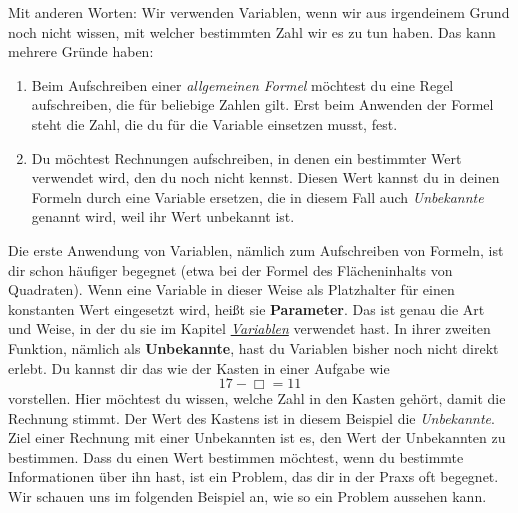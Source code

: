 \documentclass[../../main.tex]{subfiles}
\begin{document}
Mit anderen Worten: Wir verwenden Variablen, wenn wir aus irgendeinem Grund noch nicht wissen, mit welcher bestimmten Zahl wir es zu tun haben. Das kann mehrere Gründe haben:

\begin{enumerate}
    \item Beim Aufschreiben einer \emph{allgemeinen Formel} möchtest du eine Regel aufschreiben, die für beliebige Zahlen gilt. Erst beim Anwenden der Formel steht die Zahl, die du für die Variable einsetzen musst, fest.
    \item Du möchtest Rechnungen aufschreiben, in denen ein bestimmter Wert verwendet wird, den du noch nicht kennst. Diesen Wert kannst du in deinen Formeln durch eine Variable ersetzen, die in diesem Fall auch \emph{Unbekannte} genannt wird, weil ihr Wert unbekannt ist.
\end{enumerate}

Die erste Anwendung von Variablen, nämlich zum Aufschreiben von Formeln, ist dir schon häufiger begegnet (etwa bei der Formel des Flächeninhalts von Quadraten). Wenn eine Variable in dieser Weise als Platzhalter für einen konstanten Wert eingesetzt wird, heißt sie \textbf{Parameter}. Das ist genau die Art und Weise, in der du sie im Kapitel \href{ch:variablen}{\emph{Variablen}} verwendet hast. In ihrer zweiten Funktion, nämlich als \textbf{Unbekannte}, hast du Variablen bisher noch nicht direkt erlebt. Du kannst dir das wie der Kasten in einer Aufgabe wie
\[17-\Box=11\] 
vorstellen. Hier möchtest du wissen, welche Zahl in den Kasten gehört, damit die Rechnung stimmt. Der Wert des Kastens ist in diesem Beispiel die \emph{Unbekannte}. Ziel einer Rechnung mit einer Unbekannten ist es, den Wert der Unbekannten zu bestimmen. Dass du einen Wert bestimmen möchtest, wenn du bestimmte Informationen über ihn hast, ist ein Problem, das dir in der Praxs oft begegnet. Wir schauen uns im folgenden Beispiel an, wie so ein Problem aussehen kann.
\end{document}
